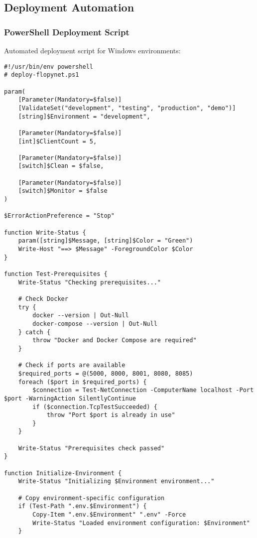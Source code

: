 \subsection{Deployment Automation}

\subsubsection{PowerShell Deployment Script}

Automated deployment script for Windows environments:

\begin{lstlisting}[style=dockercode, caption=PowerShell Deployment Script]
#!/usr/bin/env powershell
# deploy-flopynet.ps1

param(
    [Parameter(Mandatory=$false)]
    [ValidateSet("development", "testing", "production", "demo")]
    [string]$Environment = "development",
    
    [Parameter(Mandatory=$false)]
    [int]$ClientCount = 5,
    
    [Parameter(Mandatory=$false)]
    [switch]$Clean = $false,
    
    [Parameter(Mandatory=$false)]
    [switch]$Monitor = $false
)

$ErrorActionPreference = "Stop"

function Write-Status {
    param([string]$Message, [string]$Color = "Green")
    Write-Host "==> $Message" -ForegroundColor $Color
}

function Test-Prerequisites {
    Write-Status "Checking prerequisites..."
    
    # Check Docker
    try {
        docker --version | Out-Null
        docker-compose --version | Out-Null
    } catch {
        throw "Docker and Docker Compose are required"
    }
    
    # Check if ports are available
    $required_ports = @(5000, 8000, 8001, 8080, 8085)
    foreach ($port in $required_ports) {
        $connection = Test-NetConnection -ComputerName localhost -Port $port -WarningAction SilentlyContinue
        if ($connection.TcpTestSucceeded) {
            throw "Port $port is already in use"
        }
    }
    
    Write-Status "Prerequisites check passed"
}

function Initialize-Environment {
    Write-Status "Initializing $Environment environment..."
    
    # Copy environment-specific configuration
    if (Test-Path ".env.$Environment") {
        Copy-Item ".env.$Environment" ".env" -Force
        Write-Status "Loaded environment configuration: $Environment"
    }
    

\end{lstlisting}
